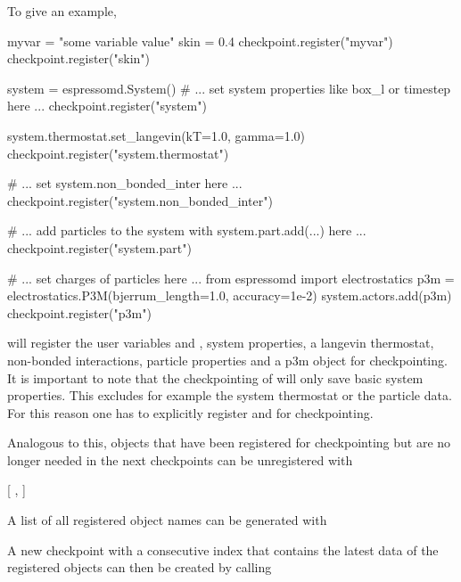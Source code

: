 To give an example,
\begin{pycode}
    myvar = "some variable value"
    skin = 0.4
    checkpoint.register("myvar")
    checkpoint.register("skin")
    
    system = espressomd.System()
    # ... set system properties like box_l or timestep here ...
    checkpoint.register("system")
    
    system.thermostat.set_langevin(kT=1.0, gamma=1.0)
    checkpoint.register("system.thermostat")
    
    # ... set system.non_bonded_inter here ...
    checkpoint.register("system.non_bonded_inter")
    
    # ... add particles to the system with system.part.add(...) here ...
    checkpoint.register("system.part")
    
    # ... set charges of particles here ...
    from espressomd import electrostatics
    p3m = electrostatics.P3M(bjerrum_length=1.0, accuracy=1e-2)
    system.actors.add(p3m)
    checkpoint.register("p3m")
\end{pycode}

will register the user variables  and , system 
properties, a langevin thermostat, non-bonded interactions, particle 
properties and a p3m object for checkpointing. It is important to note that 
the checkpointing of  will only save basic system properties. This 
excludes for example the system thermostat or the particle data. For this 
reason one has to explicitly register  and 
 for checkpointing.

Analogous to this, objects that have been registered for checkpointing 
but are no longer needed in the next checkpoints can be unregistered with
\begin{pysyntax}
  [
    ,
  ]
\end{pysyntax}

\vspace{2em}
A list of all registered object names can be generated with
\begin{pysyntax}
\end{pysyntax}

\vspace{2em}
A new checkpoint with a consecutive index that contains the latest data of the 
registered objects can then be created by calling
\begin{pysyntax}
\end{pysyntax}

